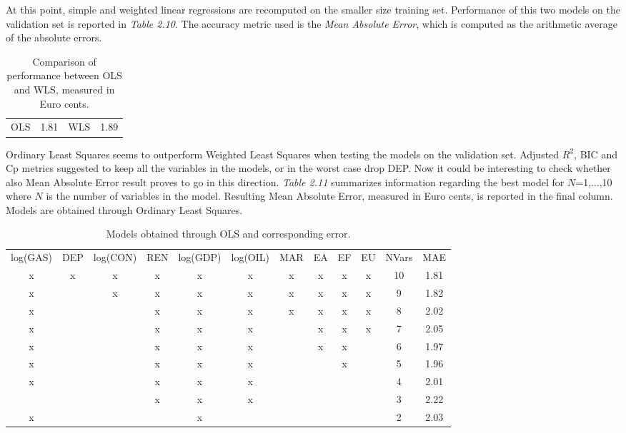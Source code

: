 \documentclass{book}
\begin{document}
At this point, simple and weighted linear regressions are recomputed on the smaller size training set. Performance of this two models on the validation set is reported in \textit{Table 2.10}. The accuracy metric used is the \textit{Mean Absolute Error}, which is computed as the arithmetic average of the absolute errors.

\bigskip
\begin{table}[H]
\begin{center}
\begin{tabular}{|c|c|c|c|}
\hline
\rowcolor{maroon} \multicolumn{4}{|c|}{Mean Absolute Error}\\
\hline
OLS&1.81&WLS&1.89\\
\hline
\end{tabular}
\caption{Comparison of performance between OLS and WLS, measured in Euro cents.}
\end{center}
\end{table}
\bigskip

Ordinary Least Squares seems to outperform Weighted Least Squares when testing the models on the validation set. Adjusted $R^2$, BIC and Cp metrics suggested to keep all the variables in the models, or in the worst case drop DEP. Now it could be interesting to check whether also Mean Absolute Error result proves to go in this direction. \textit{Table 2.11} summarizes information regarding the best model for $N$=1,...,10 where $N$ is the number of variables in the model. Resulting Mean Absolute Error, measured in Euro cents, is reported in the final column. Models are obtained through Ordinary Least Squares.

\bigskip
\begin{table}[H]
\begin{center}
\begin{tabular}{|c|c|c|c|c|c|c|c|c|c|c|c|}
\hline
\rowcolor{lightgray} \multicolumn{12}{|c|}{Mean Absolute Error, OLS}\\
\hline
log(GAS)&DEP&log(CON)&REN&log(GDP)&log(OIL)&MAR&EA&EF&EU&NVars&MAE\\
\hline
x&x&x&x&x&x&x&x&x&x&10&1.81\\
x&&x&x&x&x&x&x&x&x&9&1.82\\
x&&&x&x&x&x&x&x&x&8&2.02\\
x&&&x&x&x&&x&x&x&7&2.05\\
x&&&x&x&x&&x&x&&6&1.97\\
x&&&x&x&x&&&x&&5&1.96\\
x&&&x&x&x&&&&&4&2.01\\
&&&x&x&x&&&&&3&2.22\\
x&&&&x&&&&&&2&2.03\\
\hline
\end{tabular}
\caption{Models obtained through OLS and corresponding error.}
\end{center}
\end{table}
\bigskip
\end{document}
